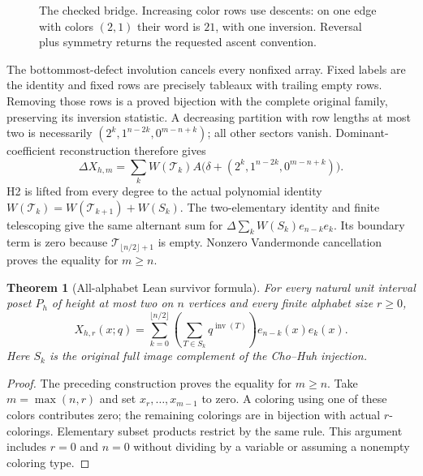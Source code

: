 \documentclass[11pt,a4paper]{article}
\newtheorem{theorem}{Theorem}[section]
\theoremstyle{definition}
\begin{document}
\begin{figure}[ht]
\centering
{}
\caption{The checked bridge. Increasing color rows use descents: on one edge
with colors $(2,1)$ their word is $21$, with one inversion. Reversal plus
symmetry returns the requested ascent convention.}
\label{fig:colorbridge}
\end{figure}

The bottommost-defect involution cancels every nonfixed array. Fixed labels
are the identity and fixed rows are precisely tableaux with trailing empty
rows. Removing those rows is a proved bijection with the complete original
family, preserving its inversion statistic. A decreasing partition with
row lengths at most two is necessarily $(2^k,1^{n-2k},0^{m-n+k})$; all other
sectors vanish. Dominant-coefficient reconstruction therefore gives
\[
 \Delta X_{h,m}=\sum_k W(\mathcal T_k)
 A\bigl(\delta+(2^k,1^{n-2k},0^{m-n+k})\bigr).
\]
H2 is lifted from every degree to the actual polynomial identity
$W(\mathcal T_k)=W(\mathcal T_{k+1})+W(S_k)$.
The two-elementary identity and finite telescoping give the same alternant
sum for $\Delta\sum_k W(S_k)e_{n-k}e_k$. Its boundary term is zero because
$\mathcal T_{\lfloor n/2\rfloor+1}$ is empty. Nonzero Vandermonde cancellation
proves the equality for $m\ge n$.

\begin{theorem}[All-alphabet Lean survivor formula]\label{thm:formalh3}
For every natural unit interval poset $P_h$ of height at most two on $n$
vertices and every finite alphabet size $r\ge0$,
\[
 X_{h,r}(x;q)=\sum_{k=0}^{\lfloor n/2\rfloor}
 \left(\sum_{T\in S_k}q^{\operatorname{inv}(T)}\right)
 e_{n-k}(x)e_k(x).
\]
Here $S_k$ is the original full image complement of the Cho--Huh injection.
\end{theorem}
\begin{proof}
The preceding construction proves the equality for $m\ge n$. Take
$m=\max(n,r)$ and set $x_r,\ldots,x_{m-1}$ to zero. A coloring using one of
these colors contributes zero; the remaining colorings are in bijection
with actual $r$-colorings. Elementary subset products restrict by the same
rule. This argument includes $r=0$ and $n=0$ without dividing by a variable
or assuming a nonempty coloring type.
\end{proof}
\end{document}
